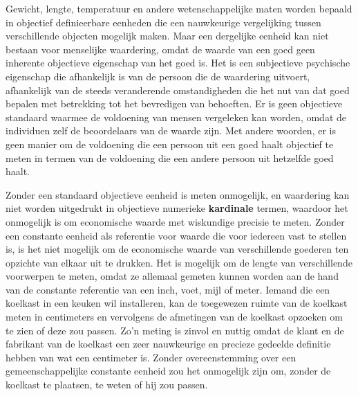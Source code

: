 Gewicht, lengte, temperatuur en andere wetenschappelijke maten worden bepaald in objectief definieerbare eenheden die een nauwkeurige vergelijking tussen verschillende objecten mogelijk maken. Maar een dergelijke eenheid kan niet bestaan voor menselijke waardering, omdat de waarde van een goed geen inherente objectieve eigenschap van het goed is. Het is een subjectieve psychische eigenschap die afhankelijk is van de persoon die de waardering uitvoert, afhankelijk van de steeds veranderende omstandigheden die het nut van dat goed bepalen met betrekking tot het bevredigen van behoeften. Er is geen objectieve standaard waarmee de voldoening van mensen vergeleken kan worden, omdat de individuen zelf de beoordelaars van de waarde zijn. Met andere woorden, er is geen manier om de voldoening die een persoon uit een goed haalt objectief te meten in termen van de voldoening die een andere persoon uit hetzelfde goed haalt.

Zonder een standaard objectieve eenheid is meten onmogelijk, en waardering kan niet worden uitgedrukt in objectieve numerieke \textbf{kardinale} termen, waardoor het onmogelijk is om economische waarde met wiskundige precisie te meten. Zonder een constante eenheid als referentie voor waarde die voor iedereen vast te stellen is, is het niet mogelijk om de economische waarde van verschillende goederen ten opzichte van elkaar uit te drukken. Het is mogelijk om de lengte van verschillende voorwerpen te meten, omdat ze allemaal gemeten kunnen worden aan de hand van de constante referentie van een inch, voet, mijl of meter. Iemand die een koelkast in een keuken wil installeren, kan de toegewezen ruimte van de koelkast meten in centimeters en vervolgens de afmetingen van de koelkast opzoeken om te zien of deze zou passen. Zo’n meting is zinvol en nuttig omdat de klant en de fabrikant van de koelkast een zeer nauwkeurige en precieze gedeelde definitie hebben van wat een centimeter is. Zonder overeenstemming over een gemeenschappelijke constante eenheid zou het onmogelijk zijn om, zonder de koelkast te plaatsen, te weten of hij zou passen.

